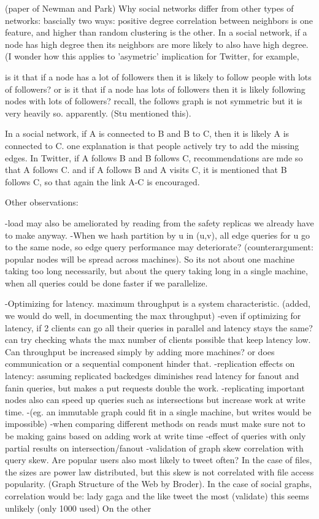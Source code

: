 \documentclass{article}
\begin{document}
(paper of Newman and Park) Why social networks differ from other types of networks:
bascially two ways: positive degree correlation between neighbors is one feature, and higher than random clustering is the other.
In a social network, if a node has high degree then its neighbors are more likely to also have  high degree. 
(I wonder how this applies to 'asymetric' implication for Twitter, for example, 

is it that if a node has a lot of followers then it is likely to follow people with lots of followers?
or is it that if a node has lots of followers then it is likely following nodes with lots of followers?
recall, the follows graph is not symmetric but it is very heavily so. apparently. (Stu mentioned this).
 
In a social network, if A is connected to B and B to C, then it is likely A is connected to C. one explanation is
that people actively try to add the missing edges.  In Twitter, if A follows B and B follows C, recommendations are mde
so that A follows C. and if A follows B and A visits C, it is mentioned that B follows C, so that again the link A-C is encouraged.


Other observations:

-load may also be ameliorated by reading from the safety replicas we already have to make anyway.
-When we hash partition by u in (u,v), all edge queries for  u go to the same node, so edge query performance may deteriorate?
(counterargument: popular nodes will be spread across machines). So its not about one machine taking too long necessarily, but
about the query taking long in a single machine, when all queries could be done faster if we parallelize.


-Optimizing for latency. maximum throughput is a system characteristic. (added, we would do well, in documenting the max throughput) 
-even if optimizing for latency, if 2 clients can go all their queries in parallel and latency stays the same? can try checking whats the max number
of clients possible that keep latency low. Can throughput be increased simply by adding more machines? or does communication or a sequential component hinder that.
-replication effects on latency: assuming replicated backedges diminishes read latency for fanout and fanin queries, but makes a put requests double the work.
-replicating important  nodes also can speed up queries such as intersections but increase work at write time.
-(eg. an immutable graph could fit in a single machine, but writes would be impossible)
-when comparing different methods on reads must make sure not to be making gains based on adding work at write time
-effect of queries with only partial results on intersection/fanout
-validation of graph skew correlation with query skew. Are popular users also most likely to tweet often?  In the case of files,
the sizes are power law distributed, but this skew is not correlated with file access popularity. (Graph Structure of the Web by Broder).
In the case of social graphs, correlation would be: lady gaga and the like tweet the most (validate) this seems unlikely (only 1000 used)
On the other 
\end{document}
